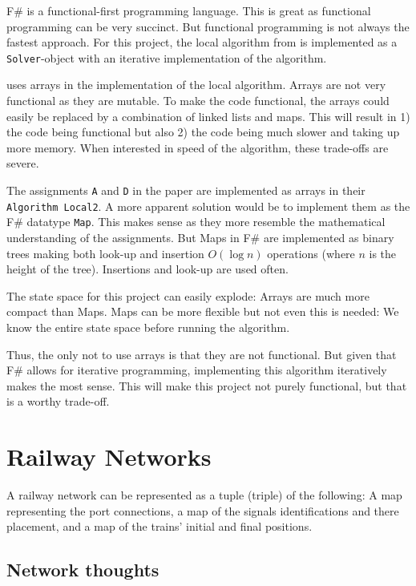 \documentclass[a4paper, 12pt, twoside]{report}
\begin{document}
F\# is a functional-first programming language. This is great as functional programming can be very succinct. But functional programming is not always the fastest approach. For this project, the local algorithm from \cite{liu1998a} is implemented as a \texttt{Solver}-object with an iterative implementation of the algorithm. 

\cite{liu1998a} uses arrays in the implementation of the local algorithm. Arrays are not very functional as they are mutable. To make the code functional, the arrays could easily be replaced by a combination of linked lists and maps. This will result in 1) the code being functional but also 2) the code being much slower and taking up more memory. When interested in speed of the algorithm, these trade-offs are severe. 

The assignments \texttt{A} and \texttt{D} in the paper are implemented as arrays in their \texttt{Algorithm Local2}. A more apparent solution would be to implement them as the F\# datatype \texttt{Map}. This makes sense as they more resemble the mathematical understanding of the assignments. But Maps in F\# are implemented as binary trees making both look-up and insertion $O(\log n)$ operations (where $n$ is the height of the tree). Insertions and look-up are used often. 


The state space for this project can easily explode: Arrays are much more compact than Maps. Maps can be more flexible but not even this is needed: We know the entire state space before running the algorithm. 

Thus, the only not to use arrays is that they are not functional. But given that F\# allows for iterative programming, implementing this algorithm iteratively makes the most sense. This will make this project not purely functional, but that is a worthy trade-off. 


\section{Railway Networks} %
\label{sec:railway-networks-implementation}

A railway network can be represented as a tuple (triple) of the following: A map representing the port connections, a map of the signals identifications and there placement, and a map of the trains' initial and final positions. 


\subsection{Network thoughts} %
\label{sec:network-thoughts}
\end{document}
